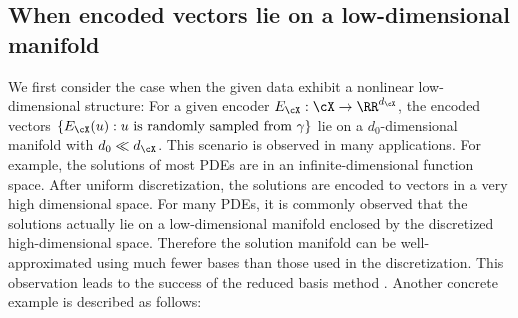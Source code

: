 \documentclass[11pt]{article} %
\begin{document}
 
 



\subsection{When encoded vectors lie on a low-dimensional manifold}

We first consider the case when the given data exhibit a  nonlinear low-dimensional structure: For a given encoder $E_{\cX}: \cX \rightarrow \RR^{d_{\cX}}$, the encoded vectors $\{E_{\cX}(u): u \text{ is randomly sampled from } \gamma\}$ lie on a $d_0$-dimensional manifold with $d_0 \ll d_{\cX}$. This scenario is observed in many applications. For example, the solutions of most PDEs are in an infinite-dimensional function space. After uniform discretization, the solutions are encoded to vectors in a very high dimensional space. For many PDEs, it is commonly observed that the solutions actually lie on a low-dimensional manifold enclosed by the discretized high-dimensional space. Therefore the solution manifold can be well-approximated using much fewer bases than those used in the discretization. This observation leads to the success of the reduced basis method \citep{haasdonk2017reduced,rozza2014fundamentals}. Another concrete example is described as follows:
%
\end{document}
